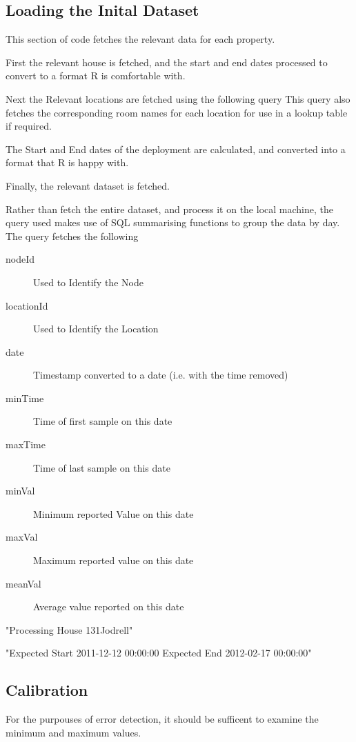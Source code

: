 \documentclass[10pt,a4paper]{article}
\begin{document}
\subsection{Loading the Inital Dataset}

This section of code fetches the relevant data for each property.

First the relevant house is fetched, and the start and end dates processed to
convert to a format R is comfortable with.

Next the Relevant locations are fetched using the following query
This query also fetches the corresponding room names for each location for use
in a lookup table if required.

The Start and End dates of the deployment are calculated, and converted into a
format that R is happy with.

Finally, the relevant dataset is fetched. 

Rather than fetch the entire dataset, and process it on the local machine, the
query used makes use of SQL summarising functions to group the data by day. 
The query fetches the following 

\begin{description}

\item[nodeId] Used to Identify the Node
\item[locationId] Used to Identify the Location
\item[date] Timestamp converted to a date (i.e. with the time removed)
\item[minTime] Time of first sample on this date
\item[maxTime] Time of last sample on this date
\item[minVal] Minimum reported Value on this date
\item[maxVal] Maximum reported value on this date
\item[meanVal] Average value reported on this date
\end{description}

\begin{Schunk}
\begin{Soutput}
[1] "Processing House  131Jodrell"
\end{Soutput}
\begin{Soutput}
[1] "Expected Start  2011-12-12 00:00:00 Expected End 2012-02-17 00:00:00"
\end{Soutput}
\end{Schunk}

\subsection{Calibration}
For the purpouses of error detection, it should be sufficent to examine the
minimum and maximum values.
\end{document}
